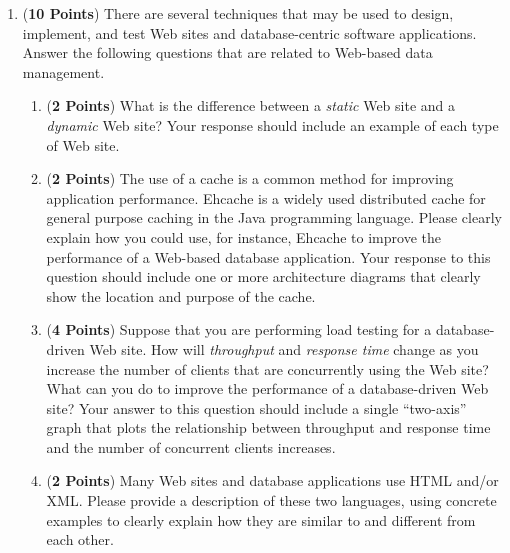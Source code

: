 \documentclass[12pt]{article}
\begin{document}
\begin{enumerate}
\begin{enumerate}
            \end{enumerate}

            \newpage

          \item ({\bf 10 Points}) There are several techniques that may be used to design, implement, and test Web sites
            and database-centric software applications.  Answer the following questions that are related to Web-based
            data management.


            \begin{enumerate}

              \item ({\bf 2 Points}) What is the difference between a {\em static} Web site and a {\em dynamic} Web
                site?  Your response should include an example of each type of Web site.

              \item ({\bf 2 Points}) The use of a cache is a common method for improving application performance.
                Ehcache is a widely used distributed cache for general purpose caching in the Java programming language.
                Please clearly explain how you could use, for instance, Ehcache to improve the performance of a
                Web-based database application.  Your response to this question should include one or more architecture
                diagrams that clearly show the location and purpose of the cache.

              \item ({\bf 4 Points}) Suppose that you are performing load testing for a database-driven Web site.  How
                will {\em throughput} and {\em response time} change as you increase the number of clients that are
                concurrently using the Web site?  What can you do to improve the performance of a database-driven Web
                site?  Your answer to this question should include a single ``two-axis'' graph that plots the
                relationship between throughput and response time and the number of concurrent clients increases.

              \item ({\bf 2 Points}) Many Web sites and database applications use HTML and/or XML. Please provide a
                description of these two languages, using concrete examples to clearly explain how they are similar to
                and different from each other. 


\end{enumerate}
\end{enumerate}
\end{document}
